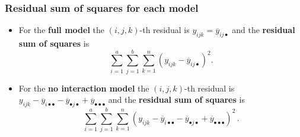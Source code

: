 \documentclass[a4paper]{article}
\begin{document}
\subsubsection{Residual sum of squares for each model}
\begin{itemize}
	\item For the \textbf{full model} the \( (i,j,k) \)-th residual is \( y_{ijk} = \overline{y}_{ij\bullet} \) and the \textbf{residual sum of squares} is
	\[
		\sum_{i=1}^a\sum_{j=1}^b\sum_{k=1}^n \left( y_{ijk}-\overline y_{ij\bullet} \right)^2.
	\]
	\item For the \textbf{no interaction model} the \( (i,j,k) \)-th residual is \( y_{ijk}-\overline y_{i\bullet\bullet}-\overline y_{\bullet j\bullet}+\overline y_{\bullet\bullet\bullet} \) and the \textbf{residual sum of squares} is
	\[
		\sum_{i=1}^a\sum_{j=1}^b\sum_{k=1}^n \left( y_{ijk}-\overline y_{i\bullet\bullet}-\overline y_{\bullet j\bullet}+\overline y_{\bullet\bullet\bullet} \right)^2\,.
	\]
\end{itemize}
\end{document}
